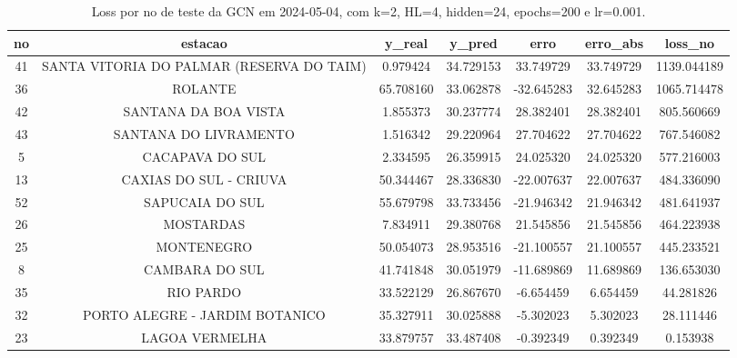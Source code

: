 \begin{table}[h]
\centering
\caption{Loss por no de teste da GCN em 2024-05-04, com k=2, HL=4, hidden=24, epochs=200 e lr=0.001.}
\label{tab:gcn_loss_k2_hl4_h24_e200_d20240504}
\begin{tabular}{ccccccc}
\toprule
no & estacao & y\_real & y\_pred & erro & erro\_abs & loss\_no \\
\midrule
41 & SANTA VITORIA DO PALMAR (RESERVA DO TAIM) & 0.979424 & 34.729153 & 33.749729 & 33.749729 & 1139.044189 \\
36 & ROLANTE & 65.708160 & 33.062878 & -32.645283 & 32.645283 & 1065.714478 \\
42 & SANTANA DA BOA VISTA & 1.855373 & 30.237774 & 28.382401 & 28.382401 & 805.560669 \\
43 & SANTANA DO LIVRAMENTO & 1.516342 & 29.220964 & 27.704622 & 27.704622 & 767.546082 \\
5 & CACAPAVA DO SUL & 2.334595 & 26.359915 & 24.025320 & 24.025320 & 577.216003 \\
13 & CAXIAS DO SUL - CRIUVA & 50.344467 & 28.336830 & -22.007637 & 22.007637 & 484.336090 \\
52 & SAPUCAIA DO SUL & 55.679798 & 33.733456 & -21.946342 & 21.946342 & 481.641937 \\
26 & MOSTARDAS & 7.834911 & 29.380768 & 21.545856 & 21.545856 & 464.223938 \\
25 & MONTENEGRO & 50.054073 & 28.953516 & -21.100557 & 21.100557 & 445.233521 \\
8 & CAMBARA DO SUL & 41.741848 & 30.051979 & -11.689869 & 11.689869 & 136.653030 \\
35 & RIO PARDO & 33.522129 & 26.867670 & -6.654459 & 6.654459 & 44.281826 \\
32 & PORTO ALEGRE - JARDIM BOTANICO & 35.327911 & 30.025888 & -5.302023 & 5.302023 & 28.111446 \\
23 & LAGOA VERMELHA & 33.879757 & 33.487408 & -0.392349 & 0.392349 & 0.153938 \\
\bottomrule
\end{tabular}
\end{table}
